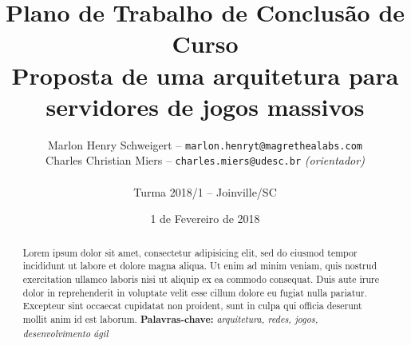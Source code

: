 \documentclass[11pt]{article}
\begin{document}
\pagestyle{fancy}

\title{
Plano de Trabalho de Conclusão de Curso\\
Proposta de uma arquitetura para servidores de jogos massivos
}

\author{
Marlon Henry Schweigert -- \texttt{marlon.henryt@magrethealabs.com}\\
Charles Christian Miers -- \texttt{charles.miers@udesc.br} {\it (orientador)}\\
~\\
Turma 2018/1 -- Joinville/SC
}

\date{1 de Fevereiro de 2018}

\maketitle


\onehalfspacing  %


\begin{abstract}
  Lorem ipsum dolor sit amet, consectetur adipisicing elit,
  sed do eiusmod tempor incididunt ut labore et dolore magna
  aliqua. Ut enim ad minim veniam, quis nostrud exercitation
  ullamco laboris nisi ut aliquip ex ea commodo consequat.
  Duis aute irure dolor in reprehenderit in voluptate velit
  esse cillum dolore eu fugiat nulla pariatur.
  Excepteur sint occaecat cupidatat non proident,
  sunt in culpa qui officia deserunt mollit anim id est
  laborum.
\textbf{Palavras-chave:} \textit{arquitetura, redes, jogos, desenvolvimento ágil}
\end{abstract}
\end{document}
